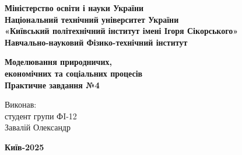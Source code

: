 \documentclass[a4paper,12pt]{article}
\begin{document}
    \pagestyle{fancy}
    \fancyhead{}
    \begin{center}
        \large{\textbf{Міністерство освіти і науки України\\
                Національний технічний університет України\\
                «Київський політехнічний інститут імені Ігоря Сікорського»\\
                Навчально-науковий Фізико-технічний інститут}}\\
        \hfill \break \hfill \break \hfill\break \hfill \break \hfill \break \hfill \break \hfill \break
        \hfill \break \hfill \break \hfill \break
        \begin{center}
            \normalsize{\textbf{Моделювання природничих, \\ економічних та соціальних процесів\\
            Практичне завдання №4}}
        \end{center}
    \end{center}
    \hfill \break \hfill \break \hfill \break \hfill \break \hfill \break \hfill \break \hfill \break
    \hfill \break \hfill \break \hfill \break \hfill \break 
    \begin{flushright}
        \large{ \hspace{35pt} Виконав:\\
            студент групи ФI-12\\
            Завалій Олександр\\} 
    \end{flushright}
    \hfill \break \hfill \break 
    \hfill \break \hfill \break \hfill \break \hfill \break \hfill \break \hfill \break \hfill \break
    \hfill \break
    \begin{center} \textbf{Київ-2025} \end{center}
    \thispagestyle{empty}
\end{document}
